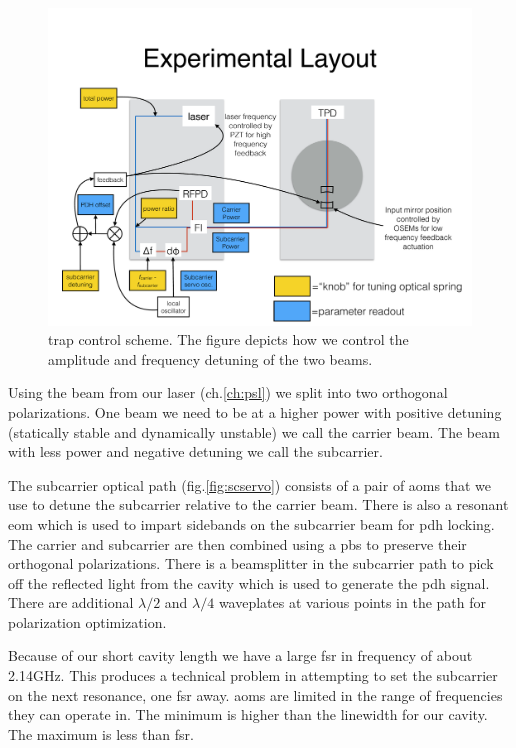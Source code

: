 \begin{figure}
\centering
\includegraphics[width=15cm]{./figures/trapcontrol1.pdf}
\caption[Linear Trap Control]{
    trap control scheme. The figure depicts how we control the amplitude and
    frequency detuning of the two beams.
    }
\label{fig:trapcontrol1}
\end{figure}


Using the beam from our laser (ch.\ref{ch:psl}) we split into two orthogonal
polarizations. One beam we need to be at a higher power with positive detuning
(statically stable and dynamically unstable) we call the carrier beam. The
beam with less power and negative detuning we call the subcarrier.

The subcarrier optical path (fig.\ref{fig:scservo}) consists of a pair of \ac{aom}s that we use to
detune the subcarrier relative to the carrier beam.
There is also a resonant
\ac{eom} which is used to impart sidebands on the subcarrier beam for \ac{pdh}
locking.
The carrier and subcarrier are then combined using a \ac{pbs} to preserve their
orthogonal polarizations. There is a beamsplitter in the subcarrier path to pick
off the reflected light from the cavity which is used to generate the \ac{pdh}
signal. There are additional $\lambda/2$ and $\lambda/4$ waveplates at various
points in the path for polarization optimization.

Because of our short cavity length we have a large \ac{fsr} in frequency of
about 2.14GHz.
This produces a technical problem in attempting to set the
subcarrier on the next resonance, one \ac{fsr} away.
\ac{aom}s are limited in the range of frequencies they can operate in.
The minimum is higher than the linewidth for our cavity.
The maximum is less than \ac{fsr}.

